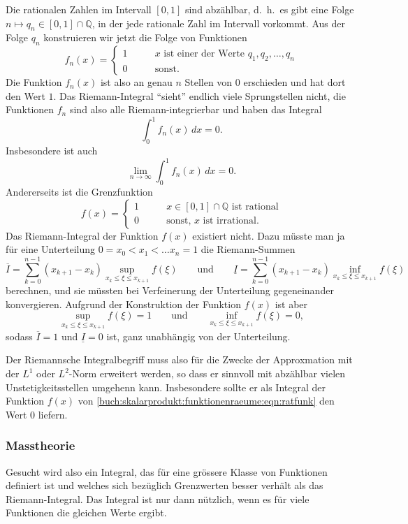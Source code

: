 Die rationalen Zahlen im Intervall $[0,1]$ sind abzählbar, d.~h.~es
gibt eine Folge $n\mapsto q_n\in[0,1]\cap\mathbb{Q}$, in der jede
rationale Zahl im Intervall vorkommt.
Aus der Folge $q_n$ konstruieren wir jetzt die Folge von Funktionen
\[
f_n(x)
=
\begin{cases} 
1&\qquad\text{$x$ ist einer der Werte $q_1,q_2,\ldots,q_n$}\\
0&\qquad\text{sonst}.
\end{cases}
\]
Die Funktion $f_n(x)$ ist also an genau $n$ Stellen von $0$ erschieden
und hat dort den Wert $1$.
Das Riemann-Integral ``sieht'' endlich viele Sprungstellen nicht,
die Funktionen $f_n$ sind also alle Riemann-integrierbar und haben
das Integral
\[
\int_0^1 f_n(x)\,dx=0.
\]
Insbesondere ist auch
\[
\lim_{n\to\infty}\int_0^1 f_n(x)\,dx = 0.
\]
Andererseits ist die Grenzfunktion
\begin{equation}
f(x)
=
\begin{cases}
1&\qquad\text{$x\in[0,1]\cap\mathbb{Q}$ ist rational}\\
0&\qquad\text{sonst, $x$ ist irrational.}
\end{cases}
\label{buch:skalarprodukt:funktionenraeume:eqn:ratfunk}
\end{equation}
Das Riemann-Integral der Funktion $f(x)$ existiert nicht.
Dazu müsste man ja für eine Unterteilung $0=x_0<x_1<\dots x_n=1$
die Riemann-Summen
\[
\overline{I}
=
\sum_{k=0}^{n-1}
(x_{k+1}-x_k) \sup_{x_k\le \xi \le x_{k+1}} f(\xi)
\qquad\text{und}\qquad
\underline{I}
=
\sum_{k=0}^{n-1}
(x_{k+1}-x_k) \inf_{x_k\le \xi \le x_{k+1}} f(\xi)
\]
berechnen, und sie müssten bei Verfeinerung der Unterteilung
gegeneinander konvergieren.
Aufgrund der Konstruktion der Funktion $f(x)$ ist aber
\[
\sup_{x_k\le \xi \le x_{k+1}} f(\xi) = 1
\qquad\text{und}\qquad
\inf_{x_k\le \xi \le x_{k+1}} f(\xi) = 0,
\]
sodass
$\overline{I}=1$ und $\underline{I}=0$ ist, ganz unabhängig von
der Unterteilung.

Der Riemannsche Integralbegriff muss also für die Zwecke der Approxmation
mit der $L^1$ oder $L^2$-Norm erweitert werden, so dass er sinnvoll mit
abzählbar vielen Unstetigkeitsstellen umgehenn kann.
Insbesondere sollte er als Integral der Funktion $f(x)$ 
von \eqref{buch:skalarprodukt:funktionenraeume:eqn:ratfunk}
den Wert $0$ liefern.

%
%
\subsubsection{Masstheorie}
Gesucht wird also ein Integral, das für eine grössere Klasse von
Funktionen definiert ist und welches sich bezüglich Grenzwerten
besser verhält als das Riemann-Integral.
Das Integral ist nur dann nützlich, wenn es für viele Funktionen
die gleichen Werte ergibt.

